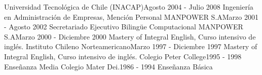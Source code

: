 %
%
%


\begin{projects}
	\project
	{Universidad Tecnológica de Chile (INACAP)}{Agosto 2004 - Julio 2008}
	{Ingeniería en Administración de Empresas, Mención Personal}
	{}{}
 	\project
	{MANPOWER S.A}{Marzo 2001 - Agosto 2002}
	{Secretariado Ejecutivo Bilingüe Computacional}
	{}{}
        \project
	{MANPOWER S.A}{Marzo 2000 - Diciembre 2000}
	{Mastery of Integral English, Curso intensivo de inglés.}
	{}{}
        \project
	{Instituto Chileno Norteamericano}{Marzo 1997 - Diciembre 1997}
	{Mastery of Integral English, Curso intensivo de inglés.}
	{}{}
        \project
	{Colegio Peter College}{1995 - 1998}
	{Enseñanza Media}
	{}{}
        \project
	{Colegio Mater Dei.}{1986 - 1994}
	{Enseñanza Básica}
	{}{}


\end{projects}
